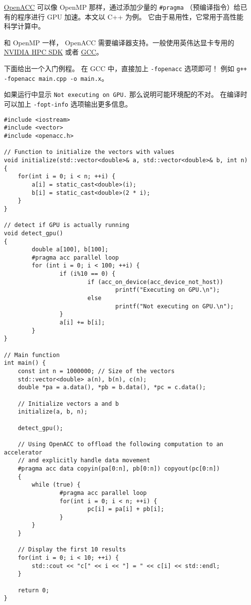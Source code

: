 
\begin{issues}
\issueDraft
\end{issues}


\href{https://www.openacc.org/}{OpenACC} 可以像 OpenMP 那样，通过添加少量的 \verb`#pragma` （预编译指令）给已有的程序进行 GPU 加速。本文以 C++ 为例。 它由于易用性，它常用于高性能科学计算中。

和 OpenMP 一样， OpenACC 需要编译器支持。一般使用英伟达显卡专用的 \href{https://developer.nvidia.com/hpc-sdk}{NVIDIA HPC SDK} 或者 \href{https://www.openacc.org/tools/gcc-for-openacc}{GCC}。

下面给出一个入门例程。 在 GCC 中，直接加上 \verb`-fopenacc` 选项即可！ 例如 \verb`g++ -fopenacc main.cpp -o main.x`。

如果运行中显示 \verb`Not executing on GPU.` 那么说明可能环境配的不对。 在编译时可以加上 \verb`-fopt-info` 选项输出更多信息。

\begin{lstlisting}[language=none,caption=test1.cpp]
#include <iostream>
#include <vector>
#include <openacc.h>

// Function to initialize the vectors with values
void initialize(std::vector<double>& a, std::vector<double>& b, int n) {
    for(int i = 0; i < n; ++i) {
        a[i] = static_cast<double>(i);
        b[i] = static_cast<double>(2 * i);
    }
}

// detect if GPU is actually running
void detect_gpu()
{
        double a[100], b[100];
        #pragma acc parallel loop
        for (int i = 0; i < 100; ++i) {
                if (i%10 == 0) {
                        if (acc_on_device(acc_device_not_host))
                                printf("Executing on GPU.\n");
                        else
                                printf("Not executing on GPU.\n");
                }
                a[i] += b[i];
        }
}

// Main function
int main() {
    const int n = 1000000; // Size of the vectors
    std::vector<double> a(n), b(n), c(n);
    double *pa = a.data(), *pb = b.data(), *pc = c.data();

    // Initialize vectors a and b
    initialize(a, b, n);

    detect_gpu();

    // Using OpenACC to offload the following computation to an accelerator
    // and explicitly handle data movement
    #pragma acc data copyin(pa[0:n], pb[0:n]) copyout(pc[0:n])
    {
        while (true) {
                #pragma acc parallel loop
                for(int i = 0; i < n; ++i) {
                        pc[i] = pa[i] + pb[i];
                }
        }
    }

    // Display the first 10 results
    for(int i = 0; i < 10; ++i) {
        std::cout << "c[" << i << "] = " << c[i] << std::endl;
    }

    return 0;
}
\end{lstlisting}

